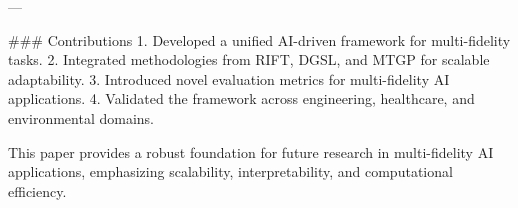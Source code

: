 ---

### Contributions
1. Developed a unified AI-driven framework for multi-fidelity tasks.
2. Integrated methodologies from RIFT, DGSL, and MTGP for scalable adaptability.
3. Introduced novel evaluation metrics for multi-fidelity AI applications.
4. Validated the framework across engineering, healthcare, and environmental domains.

This paper provides a robust foundation for future research in multi-fidelity AI applications, emphasizing scalability, interpretability, and computational efficiency.